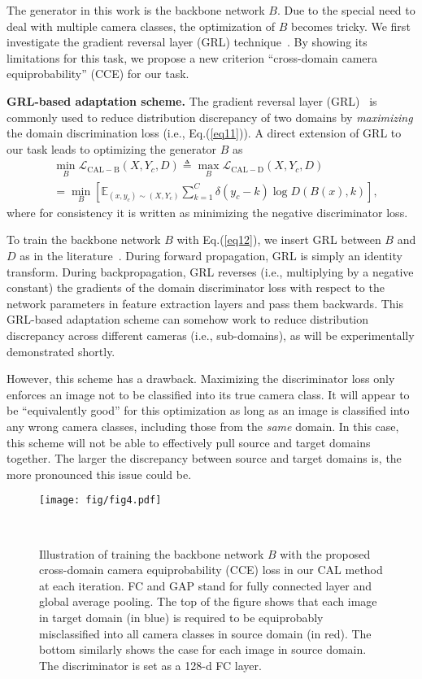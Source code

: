 \documentclass[10pt,twocolumn,letterpaper]{article}
\begin{document}
The generator in this work is the backbone network $B$. Due to the special need to deal with multiple camera classes, the optimization of $B$ becomes tricky. We first investigate the gradient reversal layer (GRL) technique~\cite{DBLP:conf/icml/GaninL15}. By showing its limitations for this task, we propose a new criterion ``cross-domain camera equiprobability'' (CCE) for our task. 

\textbf{GRL-based adaptation scheme.} The gradient reversal layer (GRL)~\cite{DBLP:conf/icml/GaninL15} is commonly used to reduce distribution discrepancy of two domains by \textit{maximizing} the domain discrimination loss (i.e., Eq.(\ref{eq11})). A direct extension of GRL to our task leads to optimizing the generator $B$ as
\begin{equation}\label{eq12}
\begin{aligned}
&\min_{B}\mathcal{L}_\mathrm{CAL-B}(X, Y_{c}, D)\triangleq\max_{B}\mathcal{L}_\mathrm{CAL-D}(X, Y_{c}, D) \\
&=\min_{B}\left[\mathbb{E}_{(x,y_{c})\sim (X,Y_{c})}\sum_{k=1}^{C}\delta(y_{c}-k)\log D(B(x), k)\right],
 \end{aligned}
\end{equation}where for consistency it is written as minimizing the negative discriminator loss. 

To train the backbone network $B$ with Eq.(\ref{eq12}), we insert GRL between $B$ and $D$ as in the literature~\cite{DBLP:conf/icml/GaninL15}. During forward propagation, GRL is simply an identity transform. During backpropagation, GRL reverses (i.e., multiplying by a negative constant) the gradients of the domain discriminator loss with respect to the network parameters in feature extraction layers and pass them backwards. This GRL-based adaptation scheme can somehow work to reduce distribution discrepancy across different cameras (i.e., sub-domains), as will be experimentally demonstrated shortly. 

However, this scheme has a drawback. Maximizing the discriminator loss only enforces an image not to be classified into its true camera class. It will appear to be ``equivalently good'' for this optimization as long as an image is classified into any wrong camera classes, including those from the \textit{same} domain. In this case, this scheme will not be able to effectively pull source and target domains together. The larger the discrepancy between source and target domains is, the more pronounced this issue could be. 

\begin{figure}\centering
\texttt{[image: fig/fig4.pdf]}
\caption{Illustration of training the backbone network $B$ with the proposed cross-domain camera equiprobability (CCE) loss in our CAL method at each iteration. FC and GAP stand for fully connected layer and global average pooling. The top of the figure shows that each image in target domain (in blue) is required to be equiprobably misclassified into all camera classes in source domain (in red). The bottom similarly shows the case for each image in source domain. The discriminator is set as a 128-d FC layer.}​
\label{fig3}
\vspace*{-20pt}
\end{figure}
 
\end{document}
